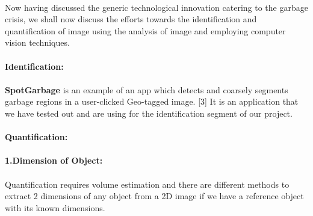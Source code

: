 \\
Now having discussed the generic technological innovation catering to the garbage crisis, we shall now discuss the efforts towards the identification and quantification of image using the analysis of image and employing computer vision techniques.\\
\\
\textbf{Identification:}\\
\\
\textbf{SpotGarbage} is an example of an app which detects and coarsely segments garbage regions in a user-clicked Geo-tagged image. [3] It is an application that we have tested out and are using for the identification segment of our project.\\
\\
\textbf{Quantification:}\\
\\
\textbf{1.Dimension of Object:}\\
\\
Quantification requires volume estimation and there are different methods to extract 2 dimensions of any object from a 2D image if we have a reference object with its known dimensions.\\
